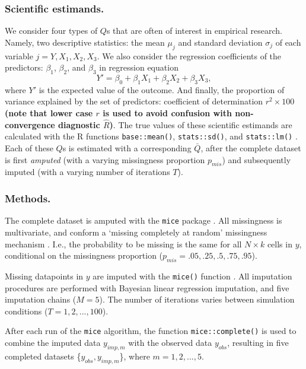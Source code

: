 \documentclass[Royal,times,sageh]{sagej}
\begin{document}
\hypertarget{scientific-estimands.}{%
\subsubsection{Scientific estimands.}\label{scientific-estimands.}}

We consider four types of \(Q\)s that are often of interest in empirical
research. Namely, two descriptive statistics: the mean \(\mu_j\) and
standard deviation \(\sigma_j\) of each variable
\(j = Y, X_1, X_2, X_3\). We also consider the regression coefficients
of the predictors: \(\beta_1\), \(\beta_2\), and \(\beta_3\) in
regression equation
\[Y' = \beta_0 + \beta_1 X_1 + \beta_2 X_2 + \beta_3 X_3,\] where \(Y'\)
is the expected value of the outcome. And finally, the proportion of
variance explained by the set of predictors: coefficient of
determination \(r^2 \times 100\) \textbf{(note that lower case \(r\) is
used to avoid confusion with non-convergence diagnostic
\(\widehat{R}\))}. The true values of these scientific estimands are
calculated with the R functions \texttt{base::mean()},
\texttt{stats::sd()}, and \texttt{stats::lm()} \citep{R}. Each of these
\(Q\)s is estimated with a corresponding \(\bar{Q}\), after the complete
dataset is first \emph{amputed} (with a varying missingness proportion
\(p_{mis}\)) and subsequently imputed (with a varying number of
iterations \(T\)).

\hypertarget{methods.}{%
\subsubsection{Methods.}\label{methods.}}

The complete dataset is amputed with the \texttt{mice} package
\citep[function \texttt{mice::ampute()};][]{mice}. All missingness is
multivariate, and conform a `missing completely at random' missingness
mechanism \citep{rubin87}. I.e., the probability to be missing is the
same for all \(N \times k\) cells in \(y\), conditional on the
missingness proportion (\(p_{mis} =.05,.25,.5,.75,.95\)).

Missing datapoints in \(y\) are imputed with the \texttt{mice()}
function \citep{mice}. All imputation procedures are performed with
Bayesian linear regression imputation, and five imputation chains
(\(M=5\)). The number of iterations varies between simulation conditions
(\(T=1,2,...,100\)).

After each run of the \texttt{mice} algorithm, the function
\texttt{mice::complete()} is used to combine the imputed data
\(y_{imp,m}\) with the observed data \(y_{obs}\), resulting in five
completed datasets \{\(y_{obs}, y_{imp, m}\)\}, where
\(m = 1, 2, ..., 5\).
\end{document}
